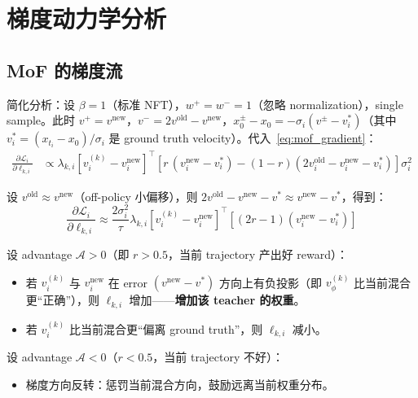 \documentclass[11pt,a4paper]{article}
\newcommand{\loss}{\mathcal{L}}
\newcommand{\vphi}{v_\phi}
\newcommand{\adv}{\mathcal{A}}
\theoremstyle{definition}
\begin{document}
\section{梯度动力学分析}
\label{sec:dynamics}

\subsection{MoF 的梯度流}

简化分析：设 $\beta = 1$（标准 NFT），$w^+ = w^- = 1$（忽略 normalization），single sample。此时 $v^+ = v^{\mathrm{new}}$，$v^- = 2v^{\mathrm{old}} - v^{\mathrm{new}}$，$x_0^\pm - x_0 = -\sigma_i(v^\pm - v^*_i)$（其中 $v^*_i = (x_{t_i} - x_0)/\sigma_i$ 是 ground truth velocity）。代入~\eqref{eq:mof_gradient}：
\begin{align}
\frac{\partial \loss_i}{\partial \ell_{k,i}} &\propto \lambda_{k,i}\left[v^{(k)}_i - v^{\mathrm{new}}_i\right]^\top \left[r\,(v^{\mathrm{new}}_i - v^*_i) - (1-r)(2v^{\mathrm{old}}_i - v^{\mathrm{new}}_i - v^*_i)\right]\sigma_i^2
\end{align}

设 $v^{\mathrm{old}} \approx v^{\mathrm{new}}$（off-policy 小偏移），则 $2v^{\mathrm{old}} - v^{\mathrm{new}} - v^* \approx v^{\mathrm{new}} - v^*$，得到：
\begin{equation}
\frac{\partial \loss_i}{\partial \ell_{k,i}} \approx \frac{2\sigma_i^2}{\tau} \lambda_{k,i}\left[v^{(k)}_i - v^{\mathrm{new}}_i\right]^\top \left[(2r-1)(v^{\mathrm{new}}_i - v^*_i)\right]
\label{eq:simplified_grad}
\end{equation}

\begin{tcolorbox}[colback=green!5, colframe=green!50, title=梯度解读]
设 advantage $\adv > 0$（即 $r > 0.5$，当前 trajectory 产出好 reward）：
\begin{itemize}
\item 若 $v^{(k)}_i$ 与 $v^{\mathrm{new}}_i$ 在 error $(v^{\mathrm{new}} - v^*)$ 方向上有负投影（即 $\vphi^{(k)}$ 比当前混合更``正确''），则 $\ell_{k,i}$ 增加——\textbf{增加该 teacher 的权重}。
\item 若 $v^{(k)}_i$ 比当前混合更``偏离 ground truth''，则 $\ell_{k,i}$ 减小。
\end{itemize}

设 advantage $\adv < 0$（$r < 0.5$，当前 trajectory 不好）：
\begin{itemize}
\item 梯度方向反转：惩罚当前混合方向，鼓励远离当前权重分布。
\end{itemize}
\end{tcolorbox}
\end{document}
